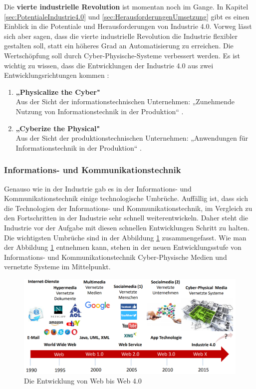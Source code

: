 \newline\newline
Die \textbf{vierte industrielle Revolution} ist momentan noch im Gange. In Kapitel \ref{sec:PotentialeIndustrie4.0} und \ref{sec:HerausforderungenUmsetzung} gibt es einen Einblick in die Potentiale und Herausforderungen von Industrie 4.0. Vorweg lässt sich aber sagen, dass die vierte industrielle Revolution die Industrie flexibler gestalten soll, statt ein höheres Grad an Automatisierung zu erreichen. Die Wertschöpfung soll durch Cyber-Physische-Systeme verbessert werden. Es ist wichtig zu wissen, dass die Entwicklungen der Industrie 4.0 aus zwei Entwicklungsrichtungen kommen \cite{1}:
\begin{enumerate}
	\item \textbf{„Physicalize the Cyber"} \cite{1} \\ Aus der Sicht der informationstechnischen Unternehmen: „Zunehmende Nutzung von Informationstechnik in der Produktion“ \cite{1}.
	\item \textbf{„Cyberize the Physical"} \cite{1} \\ Aus der Sicht der produktionstechnischen Unternehmen: „Anwendungen für Informationstechnik in der Produktion“ \cite{1}.
\end{enumerate}

\subsubsection{Informations- und Kommunikationstechnik}\label{sec:WebRevolution}
Genauso wie in der Industrie gab es in der Informations- und Kommunikationstechnik einige technologische Umbrüche. Auffällig ist, dass sich die Technologien der Informations- und Kommunikationstechnik, im Vergleich zu den Fortschritten in der Industrie sehr schnell weiterentwickeln. Daher steht die Industrie vor der Aufgabe mit diesen schnellen Entwicklungen Schritt zu halten. Die wichtigsten Umbrüche sind in der Abbildung \ref{fig:WebRevolutionBild} zusammengefasst. Wie man der Abbildung \ref{fig:WebRevolutionBild} entnehmen kann, stehen in der neuen Entwicklungsstufe von Informations- und Kommunikationstechnik Cyber-Physische Medien und vernetzte Systeme im Mittelpunkt.
\begin{figure}[h]
	\centering
	\includegraphics[width=1\linewidth]{Bilder/A2_EntwicklungWeb0-4}
	\caption{Die Entwicklung von Web bis Web 4.0 \cite{A2}}
	\label{fig:WebRevolutionBild}
\end{figure}

